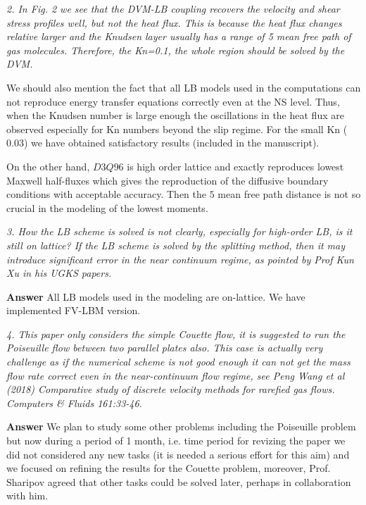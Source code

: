\documentclass{article}
\begin{document}
{\it 2.        In Fig. 2 we see that the DVM-LB coupling recovers the velocity and shear stress profiles well, but not the heat flux. This is because the heat flux changes relative larger and the Knudsen layer usually has a range of 5 mean free path of gas molecules. Therefore, the Kn=0.1, the whole region should be solved by the DVM. 
}

{\bf} We should also mention the fact that all LB  models  used in the  computations can not  reproduce energy  transfer equations correctly even at the  NS level. Thus, when the Knudsen number  is  large  enough the oscillations  in the  heat flux are  observed especially  for Kn numbers  beyond the slip regime. For the  small Kn ($0.03$) we have  obtained  satisfactory results (included in the   manuscript). 

On the  other  hand, $D3Q96$  is  high order lattice and  exactly reproduces lowest  Maxwell half-fluxes  which 
gives  the  reproduction of the diffusive  boundary  conditions  with acceptable  accuracy.  Then the $5$ mean free path distance  is not so crucial in the  modeling of the lowest moments.




{\it 3. How the LB scheme is solved is not clearly, especially for high-order LB, is it still on lattice? If the LB scheme is solved by the splitting method, then it may introduce significant error in the near continuum regime, as pointed by Prof Kun Xu in his UGKS papers.}

{\bf Answer} All LB models used  in the  modeling are on-lattice.  We have  implemented  FV-LBM version.



{ \it 4.        This paper only considers the simple Couette flow, it is suggested to run the Poiseuille flow between two parallel plates also. This case is actually very challenge as if the numerical scheme is not good enough it can not get the mass flow rate correct even in the near-continuum flow regime, see Peng Wang et al (2018) Comparative study of discrete velocity methods for rarefied gas flows. Computers \& Fluids 161:33-46.
}

{\bf Answer}  We plan to study some other problems including the Poiseuille problem but now during a period of  1 month, i.e. 
time period for revizing the paper we did not considered any new tasks (it is needed a serious effort for this aim) 
and we focused on refining the results for the Couette problem,  moreover, Prof. Sharipov agreed that other tasks could be solved later, perhaps in collaboration with him.
\end{document}
